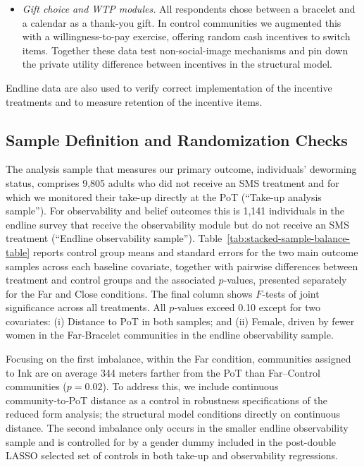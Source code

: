 \begin{enumerate}
\begin{itemize}
      \item \emph{Gift choice and WTP modules.} All respondents
  chose between a bracelet and a calendar as a thank-you gift. In
  control communities we augmented this with a willingness-to-pay exercise, offering random cash incentives to switch items. Together these data test non-social-image mechanisms and pin down the private utility difference between incentives in the structural model.                                        
  \end{itemize}
  Endline data are also used to verify correct implementation of
  the incentive treatments and to measure retention of the
  incentive items.    

\end{enumerate}

\subsection{Sample Definition and Randomization Checks} 

The analysis sample that measures our primary outcome, individuals' deworming status, comprises 9,805 adults who did not receive an SMS treatment and for which we monitored their take-up directly at the PoT (``Take-up analysis sample''). For observability and belief outcomes this is 1,141 individuals in the endline survey that receive the observability module but do not receive an SMS treatment (``Endline observability sample''). Table~\ref{tab:stacked-sample-balance-table} reports control group means and standard errors for the two main outcome samples across each baseline covariate, together with pairwise differences between treatment and control groups and the associated $p$‑values, presented separately for the Far and Close conditions. The final column shows $F$‑tests of joint significance across all treatments.  All $p$‑values exceed 0.10 except for two covariates: (i) Distance to PoT in both samples; and (ii) Female, driven by fewer women in the Far-Bracelet communities in the endline observability sample. 

Focusing on the first imbalance, within the Far condition, communities assigned to Ink are on average 344 meters farther from the PoT than Far–Control communities ($p = 0.02$). To address this, we include continuous community‑to‑PoT distance as a control in robustness specifications of the reduced form analysis; the structural model conditions directly on continuous distance. The second imbalance only occurs in the smaller endline observability sample and is controlled for by a gender dummy included in the post-double LASSO selected set of controls in both take-up and observability regressions.


